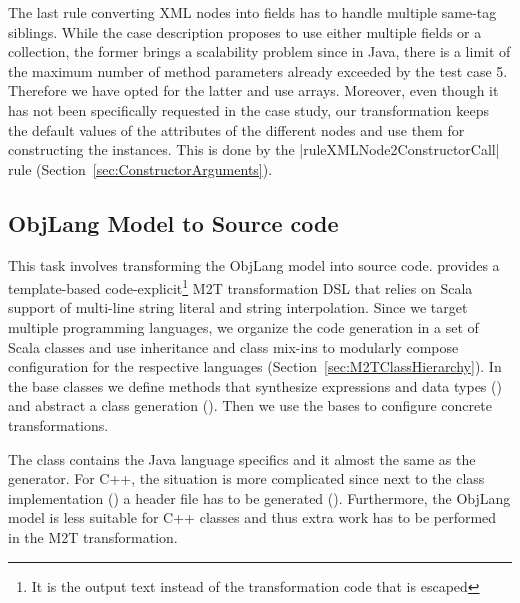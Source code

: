 The last rule converting XML nodes into fields has to handle multiple same-tag siblings.
While the case description proposes to use either multiple fields or a collection, the former brings a scalability problem since in Java, there is a limit of the maximum number of method parameters already exceeded by the test case 5.
Therefore we have opted for the latter and use arrays.
Moreover, even though it has not been specifically requested in the case study, our transformation keeps the default values of the attributes of the different nodes and use them for constructing the instances.
This is done by the \Scala|ruleXMLNode2ConstructorCall| rule (\Cf Section~\ref{sec:ConstructorArguments}).

\subsection{ObjLang Model to Source code}

\enlargethispage{20mm}

This task involves transforming the ObjLang model into source code.
\SIGMA provides a template-based code-explicit\footnote{It is the output text instead of the transformation code that is escaped} M2T transformation DSL that relies on Scala support of multi-line string literal and string interpolation.
%
Since we target multiple programming languages, we organize the code generation in a set of Scala classes and use inheritance and class mix-ins to modularly compose configuration for the respective languages (\Cf Section~\ref{sec:M2TClassHierarchy}).
In the base classes we define methods that synthesize expressions and data types (\href{https://github.com/fikovnik/ttc14-fixml-sigma/blob/master/ttc14-fixml-base/src/fr/inria/spirals/sigma/ttc14/fixml/BaseObjLangMTT.scala}{}) and abstract a class generation (\href{https://github.com/fikovnik/ttc14-fixml-sigma/blob/master/ttc14-fixml-base/src/fr/inria/spirals/sigma/ttc14/fixml/BaseObjLang2Class.scala}{}).
Then we use the bases to configure concrete transformations.

The class \href{https://github.com/fikovnik/ttc14-fixml-sigma/blob/master/ttc14-fixml-base/src/fr/inria/spirals/sigma/ttc14/fixml/ObjLang2Java.scala}{} contains the Java language specifics and it almost the same as the \Csharp \href{https://github.com/fikovnik/ttc14-fixml-sigma/blob/master/ttc14-fixml-base/src/fr/inria/spirals/sigma/ttc14/fixml/ObjLang2CSharp.scala}{} generator.
For C++, the situation is more complicated since next to the class implementation (\href{https://github.com/fikovnik/ttc14-fixml-sigma/blob/master/ttc14-fixml-base/src/fr/inria/spirals/sigma/ttc14/fixml/ObjLang2CPPClassImpl.scala}{}) a header file has to be generated (\href{https://github.com/fikovnik/ttc14-fixml-sigma/blob/master/ttc14-fixml-base/src/fr/inria/spirals/sigma/ttc14/fixml/ObjLang2CPPClassHeader.scala}{}).
Furthermore, the ObjLang model is less suitable for C++ classes and thus extra work has to be performed in the M2T transformation.

